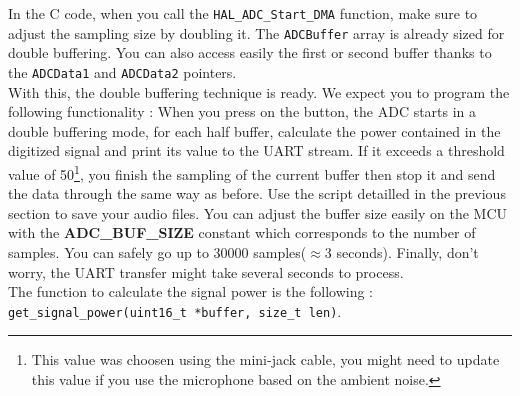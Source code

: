 
\noindent In the C code, when you call the \texttt{HAL\_ADC\_Start\_DMA} function, make sure to adjust the sampling size by doubling it. The \texttt{ADCBuffer} array is already sized for double buffering. You can also access easily the first or second buffer thanks to the \texttt{ADCData1} and \texttt{ADCData2} pointers.\\

\noindent With this, the double buffering technique is ready. We expect you to program the following functionality : When you press on the button, the ADC starts in a double buffering mode, for each half buffer, calculate the power contained in the digitized signal and print its value to the UART stream. If it exceeds a threshold value of 50\footnote{This value was choosen using the mini-jack cable, you might need to update this value if you use the microphone based on the ambient noise.}, you finish the sampling of the current buffer then stop it and send the data through the same way as before. Use the script detailled in the previous section to save your audio files. You can adjust the buffer size easily on the MCU with the \textbf{ADC\_BUF\_SIZE} constant which corresponds to the number of samples. You can safely go up to 30000 samples($\approx$3 seconds). Finally, don't worry, the UART transfer might take several seconds to process. \\

\noindent The function to calculate the signal power is the following : \texttt{get\_signal\_power(uint16\_t *buffer, size\_t len)}.


